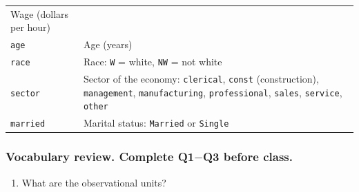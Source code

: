 \documentclass[
]{report}
\providecommand{\tightlist}{%
  \setlength{\itemsep}{0pt}\setlength{\parskip}{0pt}}
\begin{document}
\begin{longtable}[]{@{}ll@{}}
\begin{minipage}[t]{0.83\columnwidth}
Wage (dollars per hour)\strut
\end{minipage}\tabularnewline
\begin{minipage}[t]{0.11\columnwidth}\raggedright
\texttt{age}\strut
\end{minipage} & \begin{minipage}[t]{0.83\columnwidth}\raggedright
Age (years)\strut
\end{minipage}\tabularnewline
\begin{minipage}[t]{0.11\columnwidth}\raggedright
\texttt{race}\strut
\end{minipage} & \begin{minipage}[t]{0.83\columnwidth}\raggedright
Race: \texttt{W} = white, \texttt{NW} = not white\strut
\end{minipage}\tabularnewline
\begin{minipage}[t]{0.11\columnwidth}\raggedright
\texttt{sector}\strut
\end{minipage} & \begin{minipage}[t]{0.83\columnwidth}\raggedright
Sector of the economy: \texttt{clerical}, \texttt{const} (construction), \texttt{management}, \texttt{manufacturing}, \texttt{professional}, \texttt{sales}, \texttt{service}, \texttt{other}\strut
\end{minipage}\tabularnewline
\begin{minipage}[t]{0.11\columnwidth}\raggedright
\texttt{married}\strut
\end{minipage} & \begin{minipage}[t]{0.83\columnwidth}\raggedright
Marital status: \texttt{Married} or \texttt{Single}\strut
\end{minipage}\tabularnewline
\bottomrule
\end{longtable}

\hypertarget{vocabulary-review.-complete-q1-q3-before-class.}{%
\subsubsection*{\texorpdfstring{Vocabulary review. Complete Q1\(-\)Q3 before class.}{Vocabulary review. Complete Q1-Q3 before class.}}\label{vocabulary-review.-complete-q1-q3-before-class.}}

\begin{enumerate}
\def\labelenumi{\arabic{enumi}.}
\tightlist
\item
  What are the observational units?
\end{enumerate}
\end{document}
